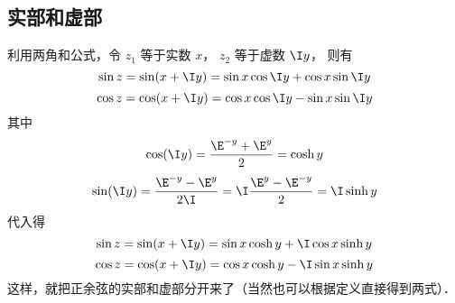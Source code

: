\subsection{实部和虚部}
利用两角和公式，令 $z_1$ 等于实数 $x$，  $z_2$ 等于虚数 $\I y$， 则有
 \begin{equation}
\sin z = \sin(x + \I y) = \sin x\cos \I y + \cos x\sin \I y
\end{equation} 
\begin{equation}
\cos z = \cos(x + \I y) = \cos x\cos \I y - \sin x\sin \I y
\end{equation} 
其中
\begin{equation}\label{CTrig_eq5}
\cos(\I y) = \frac{\E^{-y} + \E^y}{2} = \cosh y
\end{equation} 
\begin{equation}\label{CTrig_eq6}
\sin(\I y) = \frac{\E^{-y} - \E^y}{2\I} = \I\frac{\E^y - \E^{-y}}{2} = \I\sinh y
\end{equation} 
代入得
\begin{equation}
\sin z = \sin(x + \I y) = \sin x\cosh y + \I\cos x\sinh y
\end{equation} 
\begin{equation}
\cos z = \cos(x + \I y) = \cos x\cosh y - \I\sin x\sinh y
\end{equation}  
这样，就把正余弦的实部和虚部分开来了（当然也可以根据定义直接得到两式）．























